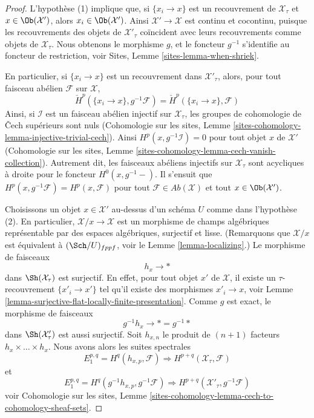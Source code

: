 \begin{proof}
L'hypothèse (1) implique que, si $\{x_i \to x\}$ est un recouvrement
de $\mathcal{X}_\tau$ et $x \in \Ob(\mathcal{X}')$, alors
$x_i \in \Ob(\mathcal{X}')$. Ainsi $\mathcal{X}' \to \mathcal{X}$
est continu et cocontinu, puisque les recouvrements des objets de
$\mathcal{X}'_\tau$ coïncident avec leurs recouvrements comme objets de
$\mathcal{X}_\tau$. Nous obtenons le morphisme $g$, et le foncteur
$g^{-1}$ s'identifie au foncteur de restriction, voir
Sites, Lemme \ref{sites-lemma-when-shriek}.

\medskip\noindent
En particulier, si $\{x_i \to x\}$ est un recouvrement dans $\mathcal{X}'_\tau$,
alors, pour tout faisceau abélien $\mathcal{F}$ sur $\mathcal{X}$,
$$
\check H^p(\{x_i \to x\}, g^{-1}\mathcal{F}) =
\check H^p(\{x_i \to x\}, \mathcal{F})
$$
Ainsi, si $\mathcal{I}$ est un faisceau abélien injectif sur $\mathcal{X}_\tau$,
les groupes de cohomologie de {\v C}ech supérieurs sont nuls
(Cohomologie sur les sites,
Lemme \ref{sites-cohomology-lemma-injective-trivial-cech}).
Ainsi $H^p(x, g^{-1}\mathcal{I}) = 0$ pour tout objet $x$
de $\mathcal{X}'$
(Cohomologie sur les sites,
Lemme \ref{sites-cohomology-lemma-cech-vanish-collection}).
Autrement dit, les faisceaux abéliens injectifs sur $\mathcal{X}_\tau$
sont acycliques à droite pour le foncteur $H^0(x, g^{-1}-)$.
Il s'ensuit que $H^p(x, g^{-1}\mathcal{F}) = H^p(x, \mathcal{F})$
pour tout $\mathcal{F} \in \textit{Ab}(\mathcal{X})$ et tout
$x \in \Ob(\mathcal{X}')$.

\medskip\noindent
Choisissons un objet $x \in \mathcal{X}'$ au-dessus d'un schéma $U$
comme dans l'hypothèse (2). En particulier, $\mathcal{X}/x \to \mathcal{X}$
est un morphisme de champs algébriques représentable par des espaces algébriques,
surjectif et lisse. (Remarquons que $\mathcal{X}/x$ est équivalent à
$(\Sch/U)_{fppf}$, voir le Lemme \ref{lemma-localizing}.)
Le morphisme de faisceaux
$$
h_x \longrightarrow *
$$
dans $\Sh(\mathcal{X}_\tau)$ est surjectif. En effet, pour tout objet $x'$
de $\mathcal{X}$, il existe un $\tau$-recouvrement $\{x'_i \to x'\}$
tel qu'il existe des morphismes $x'_i \to x$, voir
Lemme \ref{lemma-surjective-flat-locally-finite-presentation}.
Comme $g$ est exact, le morphisme de faisceaux
$$
g^{-1}h_x \longrightarrow * = g^{-1}*
$$
dans $\Sh(\mathcal{X}'_\tau)$ est aussi surjectif. Soit $h_{x, n}$ le
produit de $(n + 1)$ facteurs $h_x \times \ldots \times h_x$.
Nous avons alors les suites spectrales
\begin{equation}
\label{equation-spectral-sequence-one}
E_1^{p, q} = H^q(h_{x, p}, \mathcal{F}) \Rightarrow
H^{p + q}(\mathcal{X}_\tau, \mathcal{F})
\end{equation}
et
\begin{equation}
\label{equation-spectral-sequence-two}
E_1^{p, q} = H^q(g^{-1}h_{x, p}, g^{-1}\mathcal{F}) \Rightarrow
H^{p + q}(\mathcal{X}'_\tau, g^{-1}\mathcal{F})
\end{equation}
voir Cohomologie sur les sites,
Lemme \ref{sites-cohomology-lemma-cech-to-cohomology-sheaf-sets}.


\end{proof}
